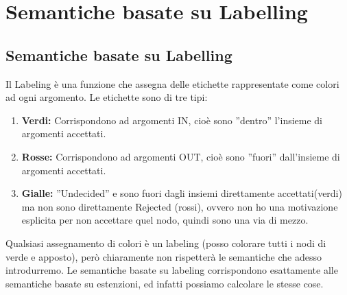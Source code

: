 \chapter{Semantiche basate su Labelling} \label{ch:Semantiche basate su Labelling}
\section{Semantiche basate su Labelling}
Il Labeling è una funzione che assegna delle etichette rappresentate come colori ad ogni argomento. Le etichette sono di tre tipi:
\begin{enumerate}
    \item \textbf{Verdi:} Corrispondono ad argomenti IN, cioè sono ”dentro” l’insieme di argomenti accettati.
    \item \textbf{Rosse:} Corrispondono ad argomenti OUT, cioè sono ”fuori” dall’insieme di argomenti accettati.
    \item \textbf{Gialle:} ”Undecided” e sono fuori dagli insiemi direttamente accettati(verdi) ma non sono direttamente Rejected (rossi), ovvero non ho una motivazione esplicita per non accettare quel nodo, quindi sono una via di mezzo.
\end{enumerate}
Qualsiasi assegnamento di colori è un labeling (posso colorare tutti i nodi di verde e apposto), però chiaramente non rispetterà le semantiche che adesso introdurremo. Le semantiche basate su labeling corrispondono esattamente alle semantiche basate su estenzioni, ed infatti possiamo calcolare le stesse
cose.
\newpage
